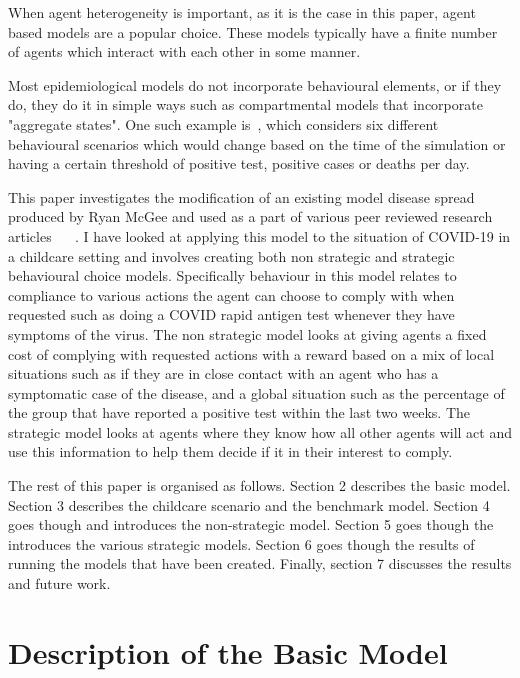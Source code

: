 \documentclass{article}
\begin{document}
When agent heterogeneity is important, as it is the case in this paper, agent based models are a popular choice. 
These models typically have a finite number of agents which interact with each other in some manner.
 
Most epidemiological models do not incorporate behavioural elements, or if they do, they do it in simple ways such as compartmental models that incorporate "aggregate states". One such example is~\cite{karaivanov_2020}, which  considers six different behavioural scenarios which would change based on the time of the simulation or having a certain threshold of positive test, positive cases or deaths per day.

This paper investigates the modification of an existing model disease spread produced by Ryan McGee and used as a part of various peer reviewed research articles ~\cite{mcgee_homburger_williams_bergstrom_zhou_2021} ~\cite{mcgee_homburger_williams_bergstrom_zhou_2021_2}. 
I have looked at applying this model to the situation of COVID-19 in a childcare setting and involves creating both non strategic and strategic behavioural choice models. Specifically behaviour in this model relates to compliance to various actions the agent can choose to comply with when requested such as doing a COVID rapid antigen test whenever they have symptoms of the virus. The non strategic model looks at giving agents a fixed cost of complying with requested actions with a reward based on a mix of local situations such as if they are in close contact with an agent who has a symptomatic case of the disease, and a global situation such as the percentage of the group that have reported a positive test within the last two weeks. The strategic model looks at agents where they know how all other agents will act and use this information to help them decide if it in their interest to comply.\newline

The rest of this paper is organised as follows. Section 2 describes the basic model. Section 3 describes the childcare scenario and the benchmark model. Section 4 goes though and introduces the non-strategic model. Section 5 goes though the introduces the various strategic models. Section 6 goes though the results of running the models that have been created. Finally, section 7 discusses the results and future work.


\section{Description of the Basic Model \label{description}}
\end{document}
